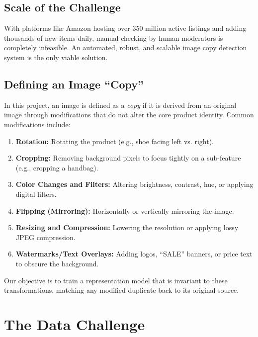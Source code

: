 \documentclass[11pt,a4paper]{article}
\begin{document}
\subsection{Scale of the Challenge}
With platforms like Amazon hosting over 350 million active listings and adding thousands of new items daily, manual checking by human moderators is completely infeasible. An automated, robust, and scalable image copy detection system is the only viable solution.

\subsection{Defining an Image ``Copy''}
In this project, an image is defined as a \textit{copy} if it is derived from an original image through modifications that do not alter the core product identity. Common modifications include:
\begin{enumerate}
    \item \textbf{Rotation:} Rotating the product (e.g., shoe facing left vs. right).
    \item \textbf{Cropping:} Removing background pixels to focus tightly on a sub-feature (e.g., cropping a handbag).
    \item \textbf{Color Changes and Filters:} Altering brightness, contrast, hue, or applying digital filters.
    \item \textbf{Flipping (Mirroring):} Horizontally or vertically mirroring the image.
    \item \textbf{Resizing and Compression:} Lowering the resolution or applying lossy JPEG compression.
    \item \textbf{Watermarks/Text Overlays:} Adding logos, ``SALE'' banners, or price text to obscure the background.
\end{enumerate}
Our objective is to train a representation model that is invariant to these transformations, matching any modified duplicate back to its original source.

\section{The Data Challenge}
\end{document}
